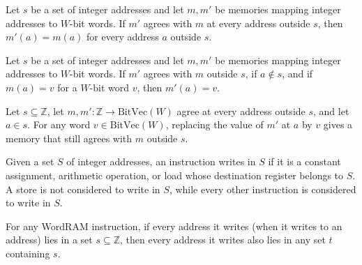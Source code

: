 \begin{theorem}
\label{WordRAM.AgreeOutside.cell}
\leanok
{}
Let $s$ be a set of integer addresses and let $m,m'$ be memories mapping integer
addresses to $W$-bit words. If $m'$ agrees with $m$ at every address outside $s$, then
$m'(a)=m(a)$ for every address $a$ outside $s$.
\end{theorem}

\begin{theorem}
\label{WordRAM.AgreeOutside.read}
\leanok
{}
Let $s$ be a set of integer addresses and let $m,m'$ be memories mapping integer
addresses to $W$-bit words. If $m'$ agrees with $m$ outside $s$, if $a\notin s$, and if
$m(a)=v$ for a $W$-bit word $v$, then $m'(a)=v$.
\end{theorem}

\begin{theorem}
\label{WordRAM.AgreeOutside.update}
\leanok
{}
Let $s\subseteq\mathbb Z$, let $m,m':\mathbb Z\to\mathrm{BitVec}(W)$ agree at every
address outside $s$, and let $a\in s$. For any word $v\in\mathrm{BitVec}(W)$, replacing
the value of $m'$ at $a$ by $v$ gives a memory that still agrees with $m$ outside $s$.
\end{theorem}

\begin{definition}
\label{WordRAM.WritesIn}
\leanok
{}
Given a set $S$ of integer addresses, an instruction writes in $S$ if it is a constant
assignment, arithmetic operation, or load whose destination register belongs to $S$. A
store is not considered to write in $S$, while every other instruction is considered to
write in $S$.
\end{definition}

\begin{theorem}
\label{WordRAM.WritesIn.mono}
\leanok
{}
For any WordRAM instruction, if every address it writes (when it writes to an address)
lies in a set $s\subseteq\mathbb Z$, then every address it writes also lies in any set
$t$ containing $s$.
\end{theorem}

